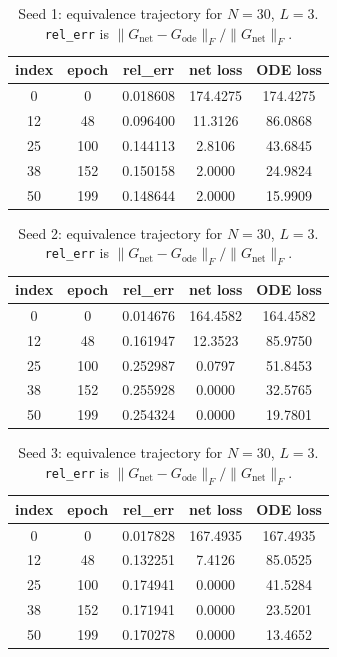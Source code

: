 \begin{table}[H]
\centering
\caption{Seed 1: equivalence trajectory for $N=30$, $L=3$. \texttt{rel\_err} is $\|G_{\mathrm{net}} - G_{\mathrm{ode}}\|_F / \|G_{\mathrm{net}}\|_F$.}
\label{tab:equiv-N30-L3-s1}
\begin{tabular}{c c c c c}
\toprule
index & epoch & rel\_err & net loss & ODE loss \\
\midrule
0 & 0 & 0.018608 & 174.4275 & 174.4275 \\
12 & 48 & 0.096400 & 11.3126 & 86.0868 \\
25 & 100 & 0.144113 & 2.8106 & 43.6845 \\
38 & 152 & 0.150158 & 2.0000 & 24.9824 \\
50 & 199 & 0.148644 & 2.0000 & 15.9909 \\
\bottomrule
\end{tabular}
\end{table}

\begin{table}[H]
\centering
\caption{Seed 2: equivalence trajectory for $N=30$, $L=3$. \texttt{rel\_err} is $\|G_{\mathrm{net}} - G_{\mathrm{ode}}\|_F / \|G_{\mathrm{net}}\|_F$.}
\label{tab:equiv-N30-L3-s2}
\begin{tabular}{c c c c c}
\toprule
index & epoch & rel\_err & net loss & ODE loss \\
\midrule
0 & 0 & 0.014676 & 164.4582 & 164.4582 \\
12 & 48 & 0.161947 & 12.3523 & 85.9750 \\
25 & 100 & 0.252987 & 0.0797 & 51.8453 \\
38 & 152 & 0.255928 & 0.0000 & 32.5765 \\
50 & 199 & 0.254324 & 0.0000 & 19.7801 \\
\bottomrule
\end{tabular}
\end{table}

\begin{table}[H]
\centering
\caption{Seed 3: equivalence trajectory for $N=30$, $L=3$. \texttt{rel\_err} is $\|G_{\mathrm{net}} - G_{\mathrm{ode}}\|_F / \|G_{\mathrm{net}}\|_F$.}
\label{tab:equiv-N30-L3-s3}
\begin{tabular}{c c c c c}
\toprule
index & epoch & rel\_err & net loss & ODE loss \\
\midrule
0 & 0 & 0.017828 & 167.4935 & 167.4935 \\
12 & 48 & 0.132251 & 7.4126 & 85.0525 \\
25 & 100 & 0.174941 & 0.0000 & 41.5284 \\
38 & 152 & 0.171941 & 0.0000 & 23.5201 \\
50 & 199 & 0.170278 & 0.0000 & 13.4652 \\
\bottomrule
\end{tabular}
\end{table}

